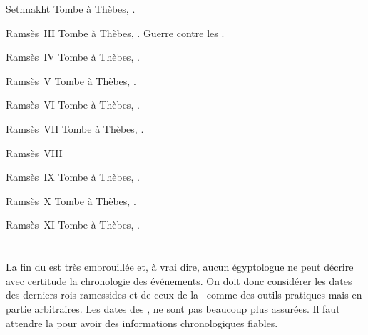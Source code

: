 \begin{listerois}
  \item [Sethnakht \datation{(c.~\anorange{1185}{1183})}] 
        Tombe à Thèbes, . 
  \item [Ramsès~III \datation{(c.~\anorange{1183}{1152})}] 
        Tombe à Thèbes, . 
        Guerre contre les .
  \item [Ramsès~IV \datation{(c.~\anorange{1152}{1145})}] 
        Tombe à Thèbes, . 
  \item [Ramsès~V \datation{(c.~\anorange{1145}{1142})}] 
        Tombe à Thèbes, . 
  \item [Ramsès~VI \datation{(c.~\anorange{1142}{1134})}] 
        Tombe à Thèbes, . 
  \item [Ramsès~VII \datation{(c.~\anorange{1134}{1126})}] 
        Tombe à Thèbes, . 
  \item [Ramsès~VIII \datation{(c.~\anorange{1126}{1125})}] 
  \item [Ramsès~IX \datation{(c.~\anorange{1125}{1107})}] 
        Tombe à Thèbes, . 
  \item [Ramsès~X \datation{(c.~\anorange{1107}{1099})}] 
        Tombe à Thèbes, . 
  \item [Ramsès~XI \datation{(c.~\anorange{1099}{1069})}] 
        Tombe à Thèbes, . 
\end{listerois}

\section{\TPI}

La fin du \NK est très embrouillée et, à vrai dire, aucun égyptologue 
ne peut décrire avec certitude la chronologie des événements. On doit 
donc considérer les dates des derniers rois ramessides et de ceux de 
la~ comme des outils pratiques mais en partie arbitraires. 
Les dates des ,  ne sont pas 
beaucoup plus assurées. Il faut attendre la  pour avoir des 
informations chronologiques fiables.

\subsection{\texorpdfstring{}{XXIe dynastie}}

